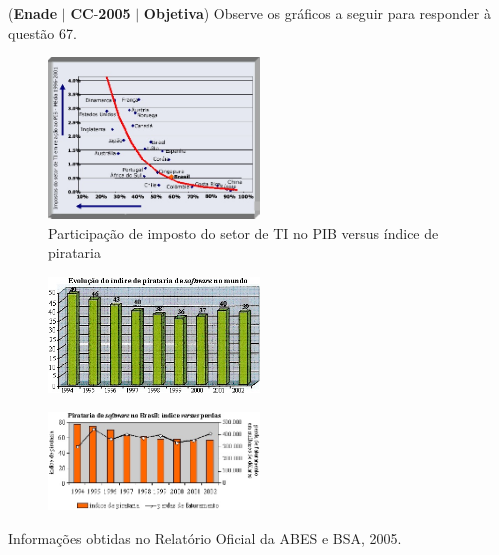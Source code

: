 \documentclass{exam}
\begin{document}
\begin{questions}
\question (\textbf{Enade} $|$ \textbf{CC}-\textbf{2005} $|$ \textbf{Objetiva})
Observe os gráficos a seguir para responder à questão 67.

\begin{figure}[H]
	\begin{center}
		\includegraphics[width=0.5\textwidth]{CIENCIA_DA_COMPUTACAO_Prova2005-utf8_figuras/fig-0033.jpg}
		\caption{Participação de imposto do setor de TI no PIB versus índice de pirataria}
	\end{center}
\end{figure}

\begin{figure}[H]
	\begin{center}
		\includegraphics[width=0.5\textwidth]{CIENCIA_DA_COMPUTACAO_Prova2005-utf8_figuras/fig-0031.jpg}
	\end{center}
\end{figure}

\begin{figure}[H]
	\begin{center}
		\includegraphics[width=0.5\textwidth]{CIENCIA_DA_COMPUTACAO_Prova2005-utf8_figuras/fig-0032.jpg}
	\end{center}
\end{figure}
Informações obtidas no Relatório Oficial da ABES e BSA, 2005.


\end{questions}
\end{document}
